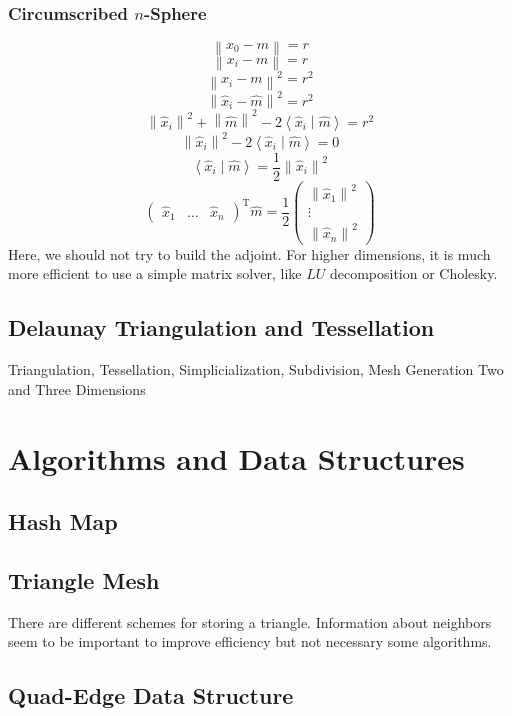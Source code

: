 \documentclass[10pt, twoside, fleqn]{article}
\let\oldsection\section
\renewcommand*\section{%
  \cleardoublepage
  \thispagestyle{sectionstyle}\oldsection}
\newcommand{\norm}[1]{\left\| #1 \right\|}
\newcommand{\scalarproduct}[2]{\left\langle #1 \middle| #2 \right\rangle}
\begin{document}
      \subsubsection{Circumscribed $n$-Sphere}
        \[
          \norm{x_0 - m} = r
        \]
        \[
          \norm{x_i - m} = r
        \]
        \[
          \norm{x_i - m}^2 = r^2
        \]
        \[
          \norm{\hat{x}_i - \hat{m}}^2 = r^2
        \]
        \[
          \norm{\hat{x}_i}^2 + \norm{\hat{m}}^2 - 2 \scalarproduct{\hat{x}_i}{\hat{m}} = r^2
        \]
        \[
          \norm{\hat{x}_i}^2 - 2 \scalarproduct{\hat{x}_i}{\hat{m}} = 0
        \]
        \[
          \scalarproduct{\hat{x}_i}{\hat{m}} = \frac{1}{2}\norm{\hat{x}_i}^2
        \]
        \[
          \begin{pmatrix}
            \hat{x}_1 & \ldots & \hat{x}_n
          \end{pmatrix}
          ^\mathrm{T}
          \hat{m}
          = \frac{1}{2}
          \begin{pmatrix}
            \norm{\hat{x}_1}^2 \\
            \vdots \\
            \norm{\hat{x}_n}^2
          \end{pmatrix}
        \]
        Here, we should not try to build the adjoint.
        For higher dimensions, it is much more efficient to use a simple matrix solver, like $LU$ decomposition or Cholesky.

    \subsection{Delaunay Triangulation and Tessellation}
      Triangulation, Tessellation, Simplicialization, Subdivision, Mesh Generation
      Two and Three Dimensions
  \section{Algorithms and Data Structures}
    \subsection{Hash Map}
    \subsection{Triangle Mesh}
      There are different schemes for storing a triangle.
      Information about neighbors seem to be important to improve efficiency but not necessary some algorithms.
    \subsection{Quad-Edge Data Structure}
\end{document}
